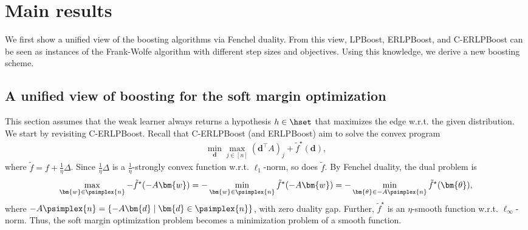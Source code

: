 \section{Main results}
\label{sec:main_result}
We first show 
a unified view of the boosting algorithms 
via Fenchel duality. 
From this view, LPBoost, ERLPBoost, and C-ERLPBoost can be seen as 
instances of the Frank-Wolfe algorithm 
with different step sizes and objectives. 
Using this knowledge, we derive a new boosting scheme. 
\subsection{A unified view of boosting for the soft margin optimization}
This section assumes that the weak learner 
always returns a hypothesis $h \in \hset$ 
that maximizes the edge w.r.t. the given distribution. 
We start by revisiting C-ERLPBoost. 
Recall that C-ERLPBoost (and ERLPBoost) aim to solve the convex program 
\begin{align}
    \label{eq:smoothed_problem}
    \min_{\bm{d}}
    \max_{j \in [n]} (\bm{d}^\top A)_j + \tilde{f}^\star (\bm{d}),
\end{align}
where $\tilde{f} = f + \frac{1}{\eta} \Delta$. 
Since $\frac{1}{\eta} \Delta$ is 
a $\frac{1}{\eta}$-strongly convex function w.r.t. $\ell_1$-norm, 
so does $\tilde{f}$. 
By Fenchel duality, the dual problem is 
\begin{align}
    \label{eq:smoothed_softmargin}
    \max_{\bm{w} \in \psimplex{n}} - \tilde{f}^\star( -A \bm{w} )
    = - \min_{\bm{w} \in \psimplex{n}}
        \tilde{f}^\star( -A \bm{w} )
    = - \min_{\bm{\theta} \in -A\psimplex{n}}
        \tilde{f}^\star(\bm{\theta}),
\end{align}
where $-A \psimplex{n} = \{ -A \bm{d} \mid \bm{d} \in \psimplex{n}\}$, 
with zero duality gap. 
Further, $\tilde{f}^\star$ is an $\eta$-smooth function 
w.r.t. $\ell_\infty$-norm. 
Thus, the soft margin optimization problem becomes 
a minimization problem of a smooth function. 

